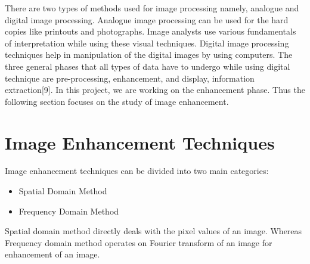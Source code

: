 There are two types of methods used for image processing namely, analogue and digital image processing. Analogue image processing can be used for the hard copies like printouts and photographs. Image analysts use various fundamentals of interpretation while using these visual techniques. Digital image processing techniques help in manipulation of the digital images by using computers. The three general phases that all types of data have to undergo while using digital technique are pre-processing, enhancement, and display, information extraction[9]. In this project, we are working on the enhancement phase. Thus the following section focuses on the study of image enhancement.


\section{Image Enhancement Techniques}
Image enhancement techniques can be divided into two main categories:
\begin{itemize}
	\item Spatial Domain Method
	\item Frequency Domain Method
\end{itemize}
Spatial domain method directly deals with the pixel values of an image. Whereas Frequency domain method operates on Fourier transform of an image for enhancement of an image.


